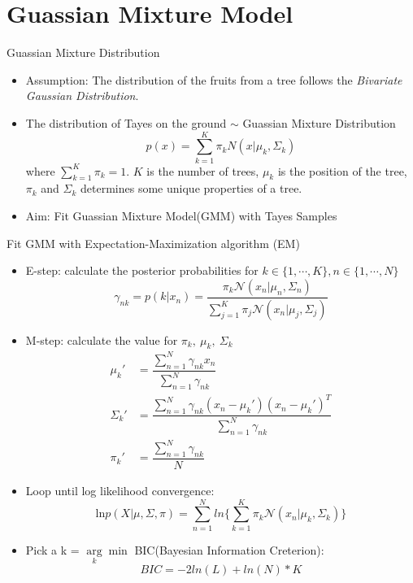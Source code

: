 \documentclass{beamer}
\begin{document}
\section{Guassian Mixture Model}
\begin{frame}{Guassian Mixture Distribution}
    \begin{itemize}
        \item Assumption: The distribution of the fruits from a tree follows the \textit{Bivariate Gaussian Distribution}. 
        \item The distribution of Tayes on the ground $\sim$ Guassian Mixture Distribution
        $$ p(x)=\sum\limits_{k=1}^K\pi_k N(x|\mu_k,\Sigma_k) $$ where $\sum\limits_{k=1}^K\pi_k = 1$. $K$ is the number of trees, $\mu_k$ is the position of the tree, $\pi_k$ and $\Sigma_k$ determines some unique properties of a tree.
        \item Aim: Fit Guassian Mixture Model(GMM) with Tayes Samples
    \end{itemize}
\end{frame}

\begin{frame}{Fit GMM with Expectation-Maximization algorithm (EM)}
    \begin{itemize}
        \item E-step: calculate the posterior probabilities for $k\in\{1,\cdots,K\}, n\in\{1,\cdots,N\}$ $$ \gamma_{nk}=p(k|x_n)=\dfrac{\pi_k\mathcal{N}(x_n|\mu_n,\Sigma_n)}{\sum_{j=1}^K\pi_j\mathcal{N}(x_n|\mu_j,\Sigma_j) } $$
        \item M-step: calculate the value for $\pi_k,\ \mu_k,\ \Sigma_k$
        \begin{align*}
            \mu_k' & = \dfrac{\sum_{n=1}^N\gamma_{nk}x_n}{\sum_{n=1}^N\gamma_{nk}}\\
            \Sigma_k' & = \dfrac{\sum_{n=1}^N\gamma_{nk}(x_n-\mu_k')(x_n-\mu_k')^T}{\sum_{n=1}^N\gamma_{nk}}\\
            \pi_k' &= \dfrac{\sum_{n=1}^N\gamma_{nk}}{N}
        \end{align*}
    \end{itemize}
\end{frame}
\begin{frame}
    \begin{itemize}
        \item Loop until log likelihood convergence:
        $$ \text{ln}p(X|\mu,\Sigma,\pi) = \sum_{n=1}^Nln\{\sum_{k=1}^K\pi_k\mathcal{N}(x_n|\mu_k,\Sigma_k)\} $$
        \item Pick a k = $\arg\limits_k\min$ BIC(Bayesian Information Creterion):
        $$ BIC = -2ln(L)+ln(N)*K $$
    \end{itemize}
\end{frame}
\end{document}
